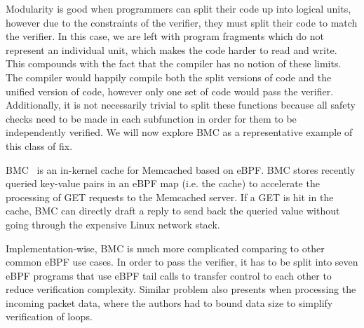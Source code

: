 Modularity is good when programmers can split their code up into logical units, however due to the constraints of the verifier, they must split their code to match the verifier.
In this case, we are left with program fragments which do not represent an individual unit, which makes the code harder to read and write.
This compounds with the fact that the compiler has no notion of these limits.
The compiler would happily compile both the split versions of code and the unified version of code, however only one set of code would pass the verifier.
Additionally, it is not necessarily trivial to split these functions because all safety checks need to be made in each subfunction in order for them to be independently verified.
We will now explore BMC as a representative example of this class of fix.

BMC~\cite{BMC} is an in-kernel cache for Memcached
    based on eBPF.
BMC stores recently queried key-value pairs in an eBPF map (i.e. the cache) to
    accelerate the processing of GET requests to the Memcached server.
If a GET is hit in the cache, BMC can directly draft a reply to send back the
    queried value without going through the expensive Linux network stack.

Implementation-wise, BMC is much more complicated
    comparing to other common eBPF use cases.
In order to pass the verifier, it has to be split into seven
    eBPF programs that use eBPF tail calls to transfer control to each other to
    reduce verification complexity.
Similar problem also presents when processing the incoming packet data, where
    the authors had to bound data size to simplify verification of loops.


